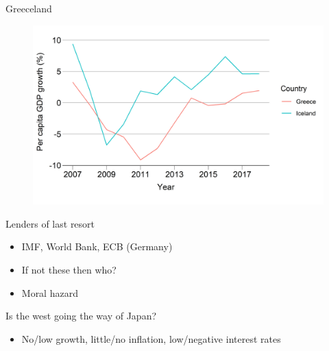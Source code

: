 \documentclass{beamer}
\begin{document}
\begin{frame}{Greeceland}
\begin{figure}
    \centering
    \includegraphics[width=\textwidth]{../img/greeceland.png}
\end{figure}{}
\end{frame}{}

\begin{frame}{Lenders of last resort}
\begin{itemize}
    \item IMF, World Bank, ECB (Germany)\pause
    \item If not these then who?\pause %
    \item Moral hazard %
\end{itemize}{}    
\end{frame}

\begin{frame}{}
\centering
\alert{\Large{Is the west going the way of Japan?}}
\begin{itemize}
    \item No/low growth, little/no inflation, low/negative interest rates
\end{itemize}{}
\end{frame}

\end{document}
